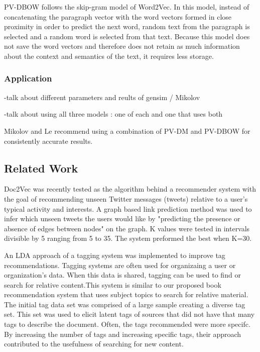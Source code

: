 PV-DBOW follows the skip-gram model of Word2Vec. In this model, instead of concatenating the paragraph vector with the word vectors formed in close proximity in order to predict the next word, random text from the paragraph is selected and a random word is selected from that text. Because this model does not save the word vectors and therefore does not retain as much information about the context and semantics of the text, it requires less storage.

\subsubsection{Application}
-talk about different parameters and reults of gensim / Mikolov 

-talk about using all three models : one of each and one that uses both

Mikolov and Le recommend using a combination of PV-DM and PV-DBOW for consistently accurate results.  \cite{RefWorks:doc:5a6e5746e4b0d609eec798d7}

\subsection{Related Work}

Doc2Vec was recently tested as the algorithm behind a recommender system with the goal of recommending unseen Twitter messages (tweets) relative to a user's typical activity and interests. A graph based link prediction method was used to infer which unseen tweets the users would like by "predicting the presence or absence of edges between nodes" on the graph.  \cite{RefWorks:doc:5a6e5746e4b0d609eec798d9} K values were tested in intervals divisible by 5 ranging from 5 to 35. The system preformed the best when K=30.

An LDA approach of a tagging system was implemented to improve tag recommendations. \cite{RefWorks:doc:5a73e055e4b0cf1dd767b18f} Tagging systems are often used for organizaing a user or organization's data. When this data is shared, tagging can be used to find or search for relative content.This system is similar to our proposed book recommendation system that uses subject topics to search for relative material. The initial tag data set was comprised of a large sample creating a diverse tag set. This set was used to elicit latent tags of sources that did not have that many tags to describe the document. Often, the tags recommended were more specifc. By increasing the number of tags and increasing specific tags, their approach contributed to the usefulness of searching for new content. 




